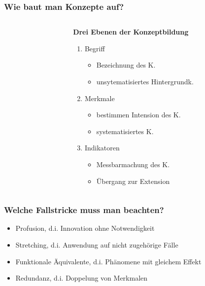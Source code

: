 \documentclass{beamer}
\begin{document}
\begin{frame}
\frametitle{Wie baut man Konzepte auf?}
\begin{columns}
\begin{column}{.4\textwidth}
\centering
{}
\end{column}
\begin{column}{.6\textwidth}
\textbf{Drei Ebenen der Konzeptbildung}
\begin{enumerate}
  \item Begriff
  \begin{itemize}
    \item Bezeichnung des K.
    \item unsytematisiertes Hintergrundk.
  \end{itemize}
  \item Merkmale
  \begin{itemize}
    \item bestimmen Intension des K.
    \item systematisiertes K.
  \end{itemize}
  \item Indikatoren
  \begin{itemize}
    \item Messbarmachung des K.
    \item Übergang zur Extension
  \end{itemize}
\end{enumerate}
\end{column}
\end{columns}
\end{frame}

\begin{frame}
\frametitle{Welche Fallstricke muss man beachten?}
\begin{itemize}
    \item Profusion, d.i. Innovation ohne Notwendigkeit
    \item Stretching, d.i. Anwendung auf nicht zugehörige Fälle
    \item Funktionale Äquivalente, d.i. Phänomene mit gleichem Effekt
    \item Redundanz, d.i. Doppelung von Merkmalen
\end{itemize}
\end{frame}
\end{document}
